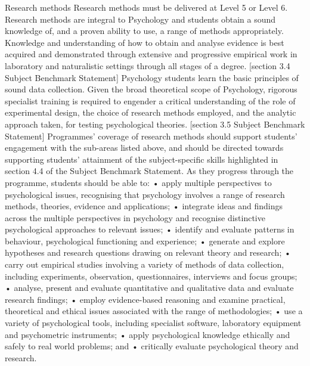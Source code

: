 \documentclass[
  11pt,
  letterpaper,
  oneside,
  open=any]{scrbook}
\begin{document}
\begin{tcolorbox}[enhanced jigsaw, rightrule=.15mm, opacitybacktitle=0.6, colbacktitle=quarto-callout-note-color!10!white, breakable, leftrule=.75mm, bottomtitle=1mm, toptitle=1mm, colback=white, titlerule=0mm, opacityback=0, title=\textcolor{quarto-callout-note-color}{\faInfo}\hspace{0.5em}{BPS website}, arc=.35mm, bottomrule=.15mm, toprule=.15mm, left=2mm, coltitle=black]

Research methods Research methods must be delivered at Level 5 or Level
6. Research methods are integral to Psychology and students obtain a
sound knowledge of, and a proven ability to use, a range of methods
appropriately. Knowledge and understanding of how to obtain and analyse
evidence is best acquired and demonstrated through extensive and
progressive empirical work in laboratory and naturalistic settings
through all stages of a degree. {[}section 3.4 Subject Benchmark
Statement{]} Psychology students learn the basic principles of sound
data collection. Given the broad theoretical scope of Psychology,
rigorous specialist training is required to engender a critical
understanding of the role of experimental design, the choice of research
methods employed, and the analytic approach taken, for testing
psychological theories. {[}section 3.5 Subject Benchmark Statement{]}
Programmes' coverage of research methods should support students'
engagement with the sub-areas listed above, and should be directed
towards supporting students' attainment of the subject-specific skills
highlighted in section 4.4 of the Subject Benchmark Statement. As they
progress through the programme, students should be able to: • apply
multiple perspectives to psychological issues, recognising that
psychology involves a range of research methods, theories, evidence and
applications; • integrate ideas and findings across the multiple
perspectives in psychology and recognise distinctive psychological
approaches to relevant issues; • identify and evaluate patterns in
behaviour, psychological functioning and experience; • generate and
explore hypotheses and research questions drawing on relevant theory and
research; • carry out empirical studies involving a variety of methods
of data collection, including experiments, observation, questionnaires,
interviews and focus groups; • analyse, present and evaluate
quantitative and qualitative data and evaluate research findings; •
employ evidence-based reasoning and examine practical, theoretical and
ethical issues associated with the range of methodologies; • use a
variety of psychological tools, including specialist software,
laboratory equipment and psychometric instruments; • apply psychological
knowledge ethically and safely to real world problems; and • critically
evaluate psychological theory and research.

\end{tcolorbox}
\end{document}
